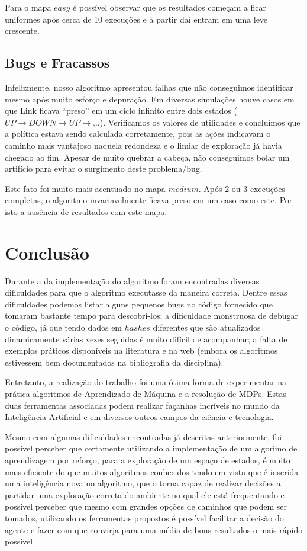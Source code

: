\documentclass[letterpaper]{article}
\begin{document}
Para o mapa $easy$ é possível observar que os resultados começam a ficar uniformes após cerca de 10 execuções e à partir daí entram em uma leve crescente.

\subsection{Bugs e Fracassos}

Infelizmente, nosso algoritmo apresentou falhas que não conseguimos identificar mesmo após muito esforço e depuração. Em diversas simulações houve casos
em que Link ficava ``preso'' em um ciclo infinito entre dois estados ($UP \rightarrow DOWN \rightarrow UP \rightarrow \ldots$). Verificamos os valores de
utilidades e concluímos que a política estava sendo calculada corretamente, pois as ações indicavam o caminho mais vantajoso naquela redondeza e o limiar
de exploração já havia chegado ao fim. Apesar de muito quebrar a cabeça, não conseguimos bolar um artifício para evitar o surgimento deste problema/bug.

Este fato foi muito mais acentuado no mapa $medium$. Após 2 ou 3 execuções completas, o algoritmo invariavelmente ficava preso em um caso como este. Por
isto a ausência de resultados com este mapa.

\section{Conclusão}

Durante a da implementação do algoritmo foram encontradas diversas dificuldades para que o algoritmo executasse da maneira correta. Dentre essas dificuldades
podemos listar alguns pequenos bugs no código fornecido que tomaram bastante tempo para descobrí-los; a dificuldade monstruosa de debugar o código, já que
tendo dados em $hashes$ diferentes que são atualizados dinamicamente várias vezes seguidas é muito difícil de acompanhar; a falta de exemplos práticos disponíveis
na literatura e na web (embora os algoritmos estivessem bem documentados na bibliografia da disciplina).

Entretanto, a realização do trabalho foi uma ótima forma de experimentar na prática algoritmos de Aprendizado de Máquina e a resolução de MDPs. Estas duas
ferramentas associadas podem realizar façanhas incríveis no mundo da Inteligência Artificial e em diversos outros campos da ciência e tecnologia.

Mesmo com algumas dificuldades encontradas já descritas anteriormente, foi possível perceber que certamente utilizando a implementação de um algorimo de aprendizagem por reforço, para a exploração
de um espaço de estados, é muito mais eficiente do que muitos algoritmos conhecidos tendo em vista que é inserida
uma inteligência nova no algoritmo, que o torna capaz de realizar decisões a partidar uma exploração correta do
ambiente no qual ele está frequentando e possível perceber que mesmo com grandes opções de caminhos que podem ser tomados, utilizando os ferramentas propostos é possível facilitar a decisão do agente e fazer com que convirja para uma média de bons resultados o mais rápido possível 
\end{document}
